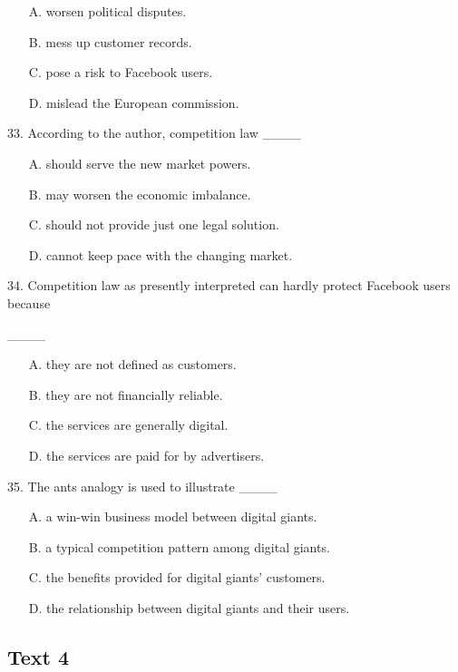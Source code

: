 \documentclass[UTF8,11pt]{ctexart}
\begin{document}
\begin{itemize}[leftmargin=2em,itemsep=.2em,topsep=.4em]\item[A.] worsen political disputes.
\item[B.] mess up customer records.
\item[C.] pose a risk to Facebook users.
\item[D.] mislead the European commission.
\end{itemize}

33. According to the author, competition law \_\_\_\_


\begin{itemize}[leftmargin=2em,itemsep=.2em,topsep=.4em]\item[A.] should serve the new market powers.
\item[B.] may worsen the economic imbalance.
\item[C.] should not provide just one legal solution.
\item[D.] cannot keep pace with the changing market.
\end{itemize}

34. Competition law as presently interpreted can hardly protect Facebook users because


\_\_\_\_


\begin{itemize}[leftmargin=2em,itemsep=.2em,topsep=.4em]\item[A.] they are not defined as customers.
\item[B.] they are not financially reliable.
\item[C.] the services are generally digital.
\item[D.] the services are paid for by advertisers.
\end{itemize}

35. The ants analogy is used to illustrate \_\_\_\_


\begin{itemize}[leftmargin=2em,itemsep=.2em,topsep=.4em]\item[A.] a win-win business model between digital giants.
\item[B.] a typical competition pattern among digital giants.
\item[C.] the benefits provided for digital giants’ customers.
\item[D.] the relationship between digital giants and their users.
\end{itemize}

\subsection*{\textbf{Text 4}}
\end{document}
